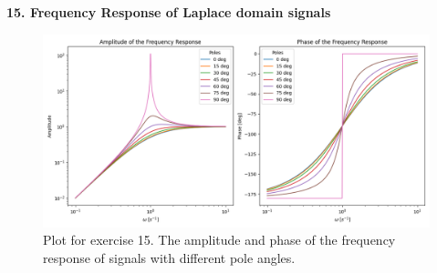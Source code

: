 \textbf{\large 15. Frequency Response of Laplace domain signals}
\\



\begin{figure}[H]
	\centering
	\includegraphics[width=16cm]{img/ex_15.png}
	\captionsetup{width=14cm}
	\caption{Plot for exercise 15. The amplitude and phase of the frequency response of signals with different pole angles.}
\end{figure}
